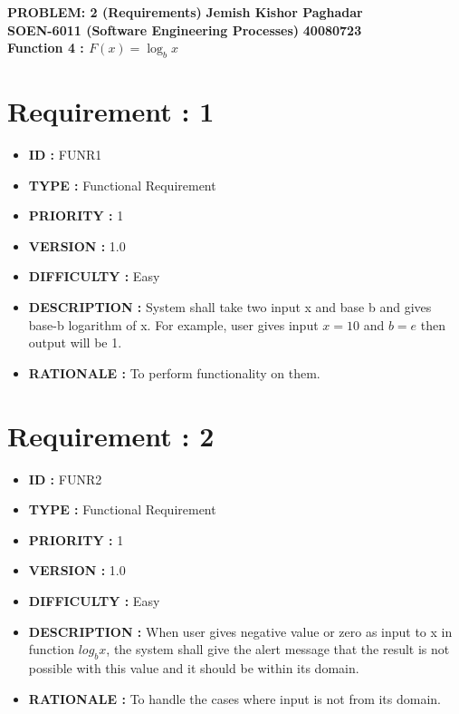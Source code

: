 \documentclass[a4paper, 11pt]{article}
\begin{document}
\noindent
\large\textbf{PROBLEM: 2 (Requirements)} \hfill \textbf{Jemish Kishor Paghadar} \\
\normalsize\textbf{ SOEN-6011 (Software Engineering Processes)} \hfill \textbf{40080723} \\
{\centering\large\textbf{Function 4 :  $F(x)= \log_b x$} \\} 



\section*{Requirement : 1}
    
    \begin{itemize}[noitemsep]
      \item \textbf{ID  : } FUNR1
      \item \textbf{TYPE  : } Functional Requirement
      \item \textbf{PRIORITY  : } 1
      \item \textbf{VERSION  : } 1.0
      \item\textbf{DIFFICULTY  :} Easy
      \item \textbf{DESCRIPTION  : } System shall take two input x and base b and gives base-b logarithm of x. For example, user gives input $x= 10$ and $b = e$ then output will be 1. 
      \item\textbf{RATIONALE  : } To perform functionality on them.
      \end{itemize}
      
\section*{Requirement : 2}
     \begin{itemize}[noitemsep]
      \item \textbf{ID  : } FUNR2
      \item \textbf{TYPE  : } Functional Requirement
      \item \textbf{PRIORITY  : } 1
      \item \textbf{VERSION  : } 1.0
      \item\textbf{DIFFICULTY  :} Easy
      \item \textbf{DESCRIPTION  : } When user gives negative value or zero as input to x in function $log_b x$, the system shall give the alert message that the result is not possible with this value and it should be within its domain.
      \item\textbf{RATIONALE  : } To handle the cases where input is not from its domain.
    \end{itemize}
    
\end{document}
